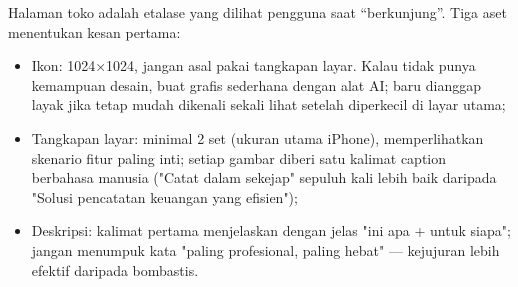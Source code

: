 
Halaman toko adalah etalase yang dilihat pengguna saat “berkunjung”. Tiga aset menentukan kesan pertama:

\begin{itemize}
  \item Ikon: 1024×1024, jangan asal pakai tangkapan layar. Kalau tidak punya kemampuan desain, buat grafis sederhana dengan alat AI; baru dianggap layak jika tetap mudah dikenali sekali lihat setelah diperkecil di layar utama;
  \item Tangkapan layar: minimal 2 set (ukuran utama iPhone), memperlihatkan skenario fitur paling inti; setiap gambar diberi satu kalimat caption berbahasa manusia ("Catat dalam sekejap" sepuluh kali lebih baik daripada "Solusi pencatatan keuangan yang efisien");
  \item Deskripsi: kalimat pertama menjelaskan dengan jelas "ini apa + untuk siapa"; jangan menumpuk kata "paling profesional, paling hebat" — kejujuran lebih efektif daripada bombastis.
\end{itemize}

